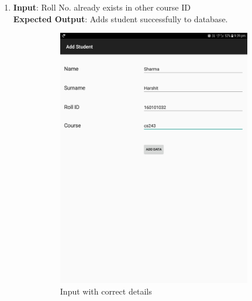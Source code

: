 \documentclass{scrreprt}
\begin{document}
\begin{itemize}
\begin{enumerate}
\item \textbf{Input}: Roll No. already exists in other course ID\\
\textbf{Expected Output}: Adds student successfully to database.
\begin{figure}[H]
\begin{subfigure}{0.5\textwidth}
\includegraphics[width=0.85\linewidth, keepaspectratio]{addok.jpg} 
\caption{Input with correct details}
\label{fig:subim1}
\end{subfigure}
\begin{subfigure}{0.5\textwidth}

\end{subfigure}
\end{figure}
\end{enumerate}
\end{itemize}
\end{document}
